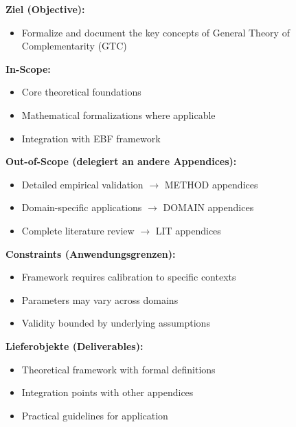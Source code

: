 \begin{tcolorbox}[
    colback=orange!5!white,
    colframe=orange!75!black,
    title={\textbf{Appendix Scope: Ziel / In-Scope / Out-of-Scope / Constraints}},
    fonttitle=\bfseries
]

\textbf{Ziel (Objective):}
\begin{itemize}[nosep]
    \item Formalize and document the key concepts of General Theory of Complementarity (GTC)
\end{itemize}

\textbf{In-Scope:}
\begin{itemize}[nosep]
    \item Core theoretical foundations
    \item Mathematical formalizations where applicable
    \item Integration with EBF framework
\end{itemize}

\textbf{Out-of-Scope (delegiert an andere Appendices):}
\begin{itemize}[nosep]
    \item Detailed empirical validation $\rightarrow$ METHOD appendices
    \item Domain-specific applications $\rightarrow$ DOMAIN appendices
    \item Complete literature review $\rightarrow$ LIT appendices
\end{itemize}

\textbf{Constraints (Anwendungsgrenzen):}
\begin{itemize}[nosep]
    \item Framework requires calibration to specific contexts
    \item Parameters may vary across domains
    \item Validity bounded by underlying assumptions
\end{itemize}

\textbf{Lieferobjekte (Deliverables):}
\begin{itemize}[nosep]
    \item Theoretical framework with formal definitions
    \item Integration points with other appendices
    \item Practical guidelines for application
\end{itemize}

\end{tcolorbox}



